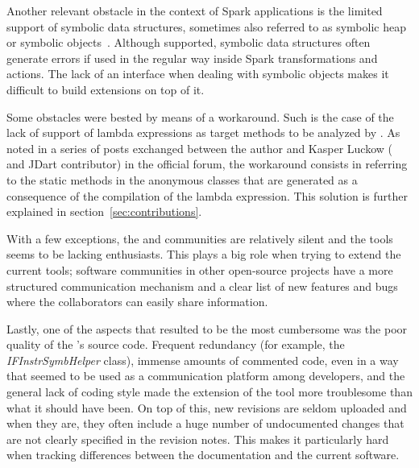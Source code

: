 Another relevant obstacle in the context of Spark applications is the limited support of symbolic data structures, sometimes also referred to as symbolic heap or symbolic objects~\cite{Pasareanu2010}. Although supported, symbolic data structures often generate errors if used in the regular way inside Spark transformations and actions. The lack of an interface when dealing with symbolic objects makes it difficult to build extensions on top of it.

Some obstacles were bested by means of a workaround. Such is the case of the lack of support of lambda expressions as target methods to be analyzed by \spf{}. As noted in a series of posts exchanged between the author and Kasper Luckow (\spf{} and JDart contributor) in the official \jpf{} forum, the workaround consists in referring to the static methods in the anonymous classes that are generated as a consequence of the compilation of the lambda expression. This solution is further explained in section~\ref{sec:contributions}.

With a few exceptions, the \jpf{} and \spf{} communities are relatively silent and the tools seems to be lacking enthusiasts. This plays a big role when trying to extend the current tools; software communities in other open-source projects have a more structured communication mechanism and a clear list of new features and bugs where the collaborators can easily share information.

Lastly, one of the aspects that resulted to be the most cumbersome was the poor quality of the \spf{}'s source code. Frequent redundancy (for example, the \textit{IFInstrSymbHelper} class), immense amounts of commented code, even in a way that seemed to be used as a communication platform among developers, and the general lack of coding style made the extension of the tool more troublesome than what it should have been. On top of this, new revisions are seldom uploaded and when they are, they often include a huge number of undocumented changes that are not clearly specified in the revision notes. This makes it particularly hard when tracking differences between the documentation and the current software.